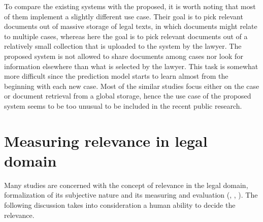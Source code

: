 \documentclass[
  digital, %
  notable,   %
  nolof,     %
  nolot,     %
]{fithesis3}
\begin{document}
To compare the existing systems with the proposed, it is worth noting that most of them implement a slightly different use case.
Their goal is to pick relevant documents out of massive storage of legal texts, in which documents might relate to multiple cases, whereas here the goal is to pick relevant documents out of a relatively small collection that is uploaded to the system by the lawyer.
The proposed system is not allowed to share documents among cases nor look for information elsewhere than what is selected by the lawyer.
This task is somewhat more difficult since the prediction model starts to learn almost from the beginning with each new case.
Most of the similar studies focus either on the case or document retrieval from a global storage, hence the use case of the proposed system seems to be too unusual to be included in the recent public research.


\section{Measuring relevance in legal domain}
\label{sec:related_relevance}
Many studies are concerned with the concept of relevance in the legal domain, formalization of its subjective nature and its measuring and evaluation (\cite{vanOpijnen2017relevance}, \cite{Hogan2010sensemaking}, \cite{Ashley2010analysis}).
The following discussion takes into consideration a human ability to decide the relevance.
\end{document}
